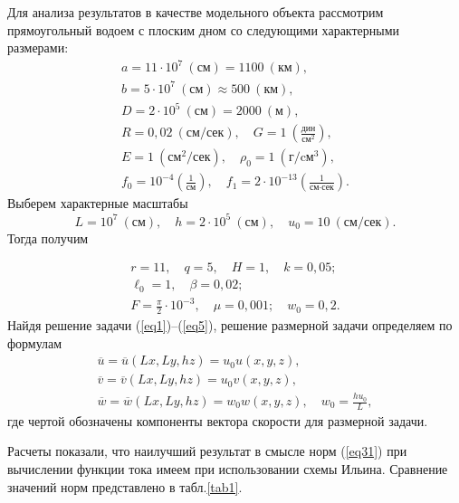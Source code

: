 \documentclass[press]{vestnik}
\begin{document}
Для анализа результатов в качестве модельного объекта рассмотрим 
прямоугольный водоем с плоским дном со следующими характерными размерами:
\[
\begin{gathered}
 a=11\cdot 10^{7}~(\text{см})=1100~(\text{км}), \\ 
 b=5\cdot 10^{7}~(\text{см})\approx 500~(\text{км}), \\ 
 D=2\cdot 10^{5}~(\text{см})=2000~(\text{м}), \\ 
 R=0,02~\left( {\text{см}/\text{сек}} \right),\quad G=1~\left( \frac{\text{дин}}{\text{см}^2} \right), \\ 
 E=1~(\text{см}^2/\text{сек}), \quad \rho_{0} =1~(\text{г}/\text{cм}^3), \\ 
 f_{0} =10^{-4} \left( \frac{1}{\text{см}} \right),\quad f_{1} =2\cdot 10^{-13}\left( \frac{1}{\text{см}\cdot\text{сек}} \right). 
\end{gathered}
\]
Выберем характерные масштабы
\[
L=10^{7}~(\text{см}),\quad h=2\cdot 10^{5}~(\text{см}),\quad u_{0} =10~(\text{см}/\text{сек}).
\]
Тогда получим

\[
\begin{gathered}
 r=11,\quad q=5,\quad H=1,\quad k=0,05;\\ 
 \ell_{0} =1,\quad \beta =0,02; \\ 
 F=\frac{\pi }{2}\cdot 10^{-3},\quad \mu =0,001;\quad w_{0} =0,2.
 \end{gathered}
\]
Найдя решение задачи (\ref{eq1})--(\ref{eq5}), решение размерной задачи определяем по 
формулам
\[
\begin{gathered}
 \overline u =\overline u \left( {Lx,Ly,hz} \right)=u_{0}  u\left( 
{x,y,z} \right), \\ 
 \overline v =\overline v \left( {Lx,Ly,hz} \right)=u_{0}  v\left( 
{x,y,z} \right), \\ 
 \overline w =\overline w \left( {Lx,Ly,hz} \right)=w_{0}  w\left( 
{x,y,z} \right),\quad w_{0} =\frac{hu_{0} }{L},
 \end{gathered}
\]
где чертой обозначены компоненты вектора скорости для размерной задачи.

Расчеты показали, что наилучший результат в смысле норм (\ref{eq31}) при вычислении 
функции тока имеем при использовании схемы Ильина. Сравнение значений норм 
представлено в табл.\ref{tab1}.
\end{document}
